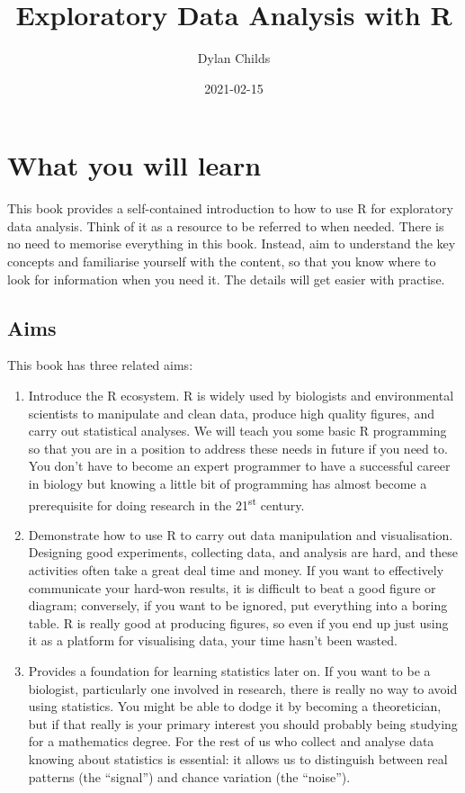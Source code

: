 \documentclass[
]{book}
\title{Exploratory Data Analysis with R}
\author{Dylan Childs}
\date{2021-02-15}
\begin{document}
\maketitle

{
\setcounter{tocdepth}{1}
\tableofcontents
}
\hypertarget{what-you-will-learn}{%
\chapter*{What you will learn}\label{what-you-will-learn}}

This book provides a self-contained introduction to how to use R for exploratory data analysis. Think of it as a resource to be referred to when needed. There is no need to memorise everything in this book. Instead, aim to understand the key concepts and familiarise yourself with the content, so that you know where to look for information when you need it. The details will get easier with practise.

\hypertarget{aims}{%
\section*{Aims}\label{aims}}

This book has three related aims:

\begin{enumerate}
\def\labelenumi{\arabic{enumi}.}
\item
  Introduce the R ecosystem. R is widely used by biologists and environmental scientists to manipulate and clean data, produce high quality figures, and carry out statistical analyses. We will teach you some basic R programming so that you are in a position to address these needs in future if you need to. You don't have to become an expert programmer to have a successful career in biology but knowing a little bit of programming has almost become a prerequisite for doing research in the 21\textsuperscript{st} century.
\item
  Demonstrate how to use R to carry out data manipulation and visualisation. Designing good experiments, collecting data, and analysis are hard, and these activities often take a great deal time and money. If you want to effectively communicate your hard-won results, it is difficult to beat a good figure or diagram; conversely, if you want to be ignored, put everything into a boring table. R is really good at producing figures, so even if you end up just using it as a platform for visualising data, your time hasn't been wasted.
\item
  Provides a foundation for learning statistics later on. If you want to be a biologist, particularly one involved in research, there is really no way to avoid using statistics. You might be able to dodge it by becoming a theoretician, but if that really is your primary interest you should probably being studying for a mathematics degree. For the rest of us who collect and analyse data knowing about statistics is essential: it allows us to distinguish between real patterns (the ``signal'') and chance variation (the ``noise'').
\end{enumerate}
\end{document}
